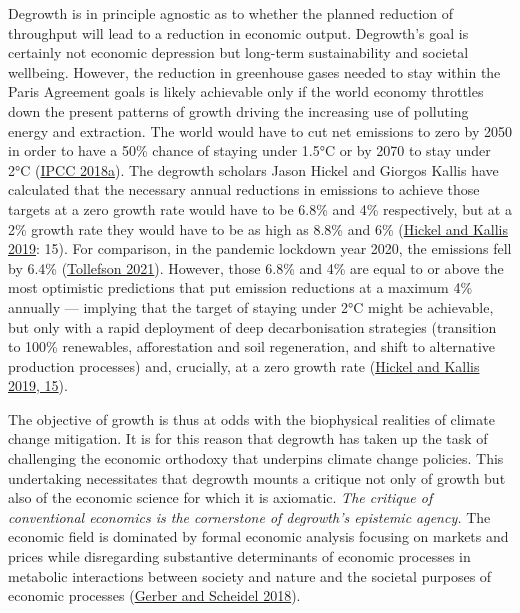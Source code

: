 \documentclass[a4paper, nobind]{templates/ociamthesis}
\begin{document}
Degrowth is in principle agnostic as to whether the planned reduction of throughput will lead to a reduction in economic output. Degrowth's goal is certainly not economic depression but long-term sustainability and societal wellbeing. However, the reduction in greenhouse gases needed to stay within the Paris Agreement goals is likely achievable only if the world economy throttles down the present patterns of growth driving the increasing use of polluting energy and extraction. The world would have to cut net emissions to zero by 2050 in order to have a 50\% chance of staying under 1.5°C or by 2070 to stay under 2°C (\protect\hyperlink{ref-ipcc_global_2018}{IPCC 2018a}). The degrowth scholars Jason Hickel and Giorgos Kallis have calculated that the necessary annual reductions in emissions to achieve those targets at a zero growth rate would have to be 6.8\% and 4\% respectively, but at a 2\% growth rate they would have to be as high as 8.8\% and 6\% (\protect\hyperlink{ref-hickel_green_2019}{Hickel and Kallis 2019}: 15). For comparison, in the pandemic lockdown year 2020, the emissions fell by 6.4\% (\protect\hyperlink{ref-tollefson_covid_2021}{Tollefson 2021}). However, those 6.8\% and 4\% are equal to or above the most optimistic predictions that put emission reductions at a maximum 4\% annually --- implying that the target of staying under 2°C might be achievable, but only with a rapid deployment of deep decarbonisation strategies (transition to 100\% renewables, afforestation and soil regeneration, and shift to alternative production processes) and, crucially, at a zero growth rate (\protect\hyperlink{ref-hickel_green_2019}{Hickel and Kallis 2019, 15}).

The objective of growth is thus at odds with the biophysical realities of climate change mitigation. It is for this reason that degrowth has taken up the task of challenging the economic orthodoxy that underpins climate change policies. This undertaking necessitates that degrowth mounts a critique not only of growth but also of the economic science for which it is axiomatic. \emph{The critique of conventional economics is the cornerstone of degrowth's epistemic agency.} The economic field is dominated by formal economic analysis focusing on markets and prices while disregarding substantive determinants of economic processes in metabolic interactions between society and nature and the societal purposes of economic processes (\protect\hyperlink{ref-gerber_search_2018}{Gerber and Scheidel 2018}).
\end{document}
